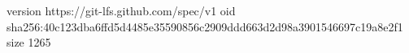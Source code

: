 version https://git-lfs.github.com/spec/v1
oid sha256:40c123dba6ffd5d4485e35590856c2909ddd663d2d98a3901546697c19a8e2f1
size 1265
